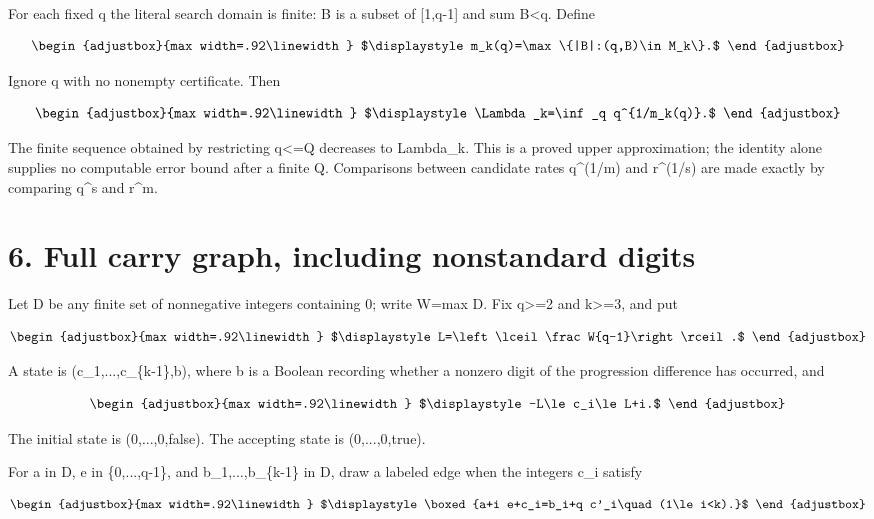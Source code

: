 For each fixed q the literal search domain is finite: B is a subset of {[}1,q-1{]} and sum B\textless q. Define

\[
\begin{adjustbox}{max width=.92\linewidth}
$\displaystyle m_k(q)=\max\{|B|:(q,B)\in M_k\}.$
\end{adjustbox}
\]

Ignore q with no nonempty certificate. Then

\[
\begin{adjustbox}{max width=.92\linewidth}
$\displaystyle \Lambda_k=\inf_q q^{1/m_k(q)}.$
\end{adjustbox}
\]

The finite sequence obtained by restricting q\textless=Q decreases to Lambda\_k. This is a proved upper approximation; the identity alone supplies no computable error bound after a finite Q. Comparisons between candidate rates q\^{}(1/m) and r\^{}(1/s) are made exactly by comparing q\^{}s and r\^{}m.

\section{6. Full carry graph, including nonstandard digits}\label{n02-full-carry-graph-including-nonstandard-digits}

Let D be any finite set of nonnegative integers containing 0; write W=max D. Fix q\textgreater=2 and k\textgreater=3, and put

\[
\begin{adjustbox}{max width=.92\linewidth}
$\displaystyle L=\left\lceil\frac W{q-1}\right\rceil.$
\end{adjustbox}
\]

A state is (c\_1,...,c\_\{k-1\},b), where b is a Boolean recording whether a nonzero digit of the progression difference has occurred, and

\[
\begin{adjustbox}{max width=.92\linewidth}
$\displaystyle -L\le c_i\le L+i.$
\end{adjustbox}
\]

The initial state is (0,...,0,false). The accepting state is (0,...,0,true).

For a in D, e in \{0,...,q-1\}, and b\_1,...,b\_\{k-1\} in D, draw a labeled edge when the integers c\textquotesingle\_i satisfy

\[
\begin{adjustbox}{max width=.92\linewidth}
$\displaystyle \boxed{a+i e+c_i=b_i+q c'_i\quad(1\le i<k).}$
\end{adjustbox}
\]

